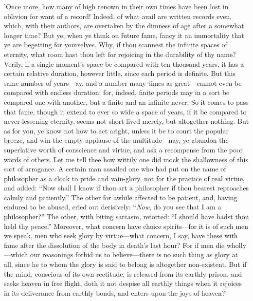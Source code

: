 'Once more, how many of high renown in their own times have been lost in
oblivion for want of a record! Indeed, of what avail are written records
even, which, with their authors, are overtaken by the dimness of age
after a somewhat longer time? But ye, when ye think on future fame,
fancy it an immortality that ye are begetting for yourselves. Why, if
thou scannest the infinite spaces of eternity, what room hast thou left
for rejoicing in the durability of thy name? Verily, if a single
moment's space be compared with ten thousand years, it has a certain
relative duration, however little, since each period is definite. But
this same number of years—ay, and a number many times as great—cannot
even be compared with endless duration; for, indeed, finite periods may
in a sort be compared one with another, but a finite and an infinite
never. So it comes to pass that fame, though it extend to ever so wide a
space of years, if it be compared to never-lessening eternity, seems not
short-lived merely, but altogether nothing. But as for you, ye know not
how to act aright, unless it be to court the popular breeze, and win the
empty applause of the multitude—nay, ye abandon the superlative worth
of conscience and virtue, and ask a recompense from the poor words of
others. Let me tell thee how wittily one did mock the shallowness of
this sort of arrogance. A certain man assailed one who had put on the
name of philosopher as a cloak to pride and vain-glory, not for the
practice of real virtue, and added: ``Now shall I know if thou art a
philosopher if thou bearest reproaches calmly and patiently.'' The other
for awhile affected to be patient, and, having endured to be abused,
cried out derisively: ``\emph{Now}, do you see that I am a philosopher?'' The
other, with biting sarcasm, retorted: ``I should have hadst thou held thy
peace.'' Moreover, what concern have choice spirits—for it is of such
men we speak, men who seek glory by virtue—what concern, I say, have
these with fame after the dissolution of the body in death's last hour?
For if men die wholly—which our reasonings forbid us to believe—there
is no such thing as glory at all, since he to whom the glory is said to
belong is altogether non-existent. But if the mind, conscious of its own
rectitude, is released from its earthly prison, and seeks heaven in free
flight, doth it not despise all earthly things when it rejoices in its
deliverance from earthly bonds, and enters upon the joys of heaven?'


